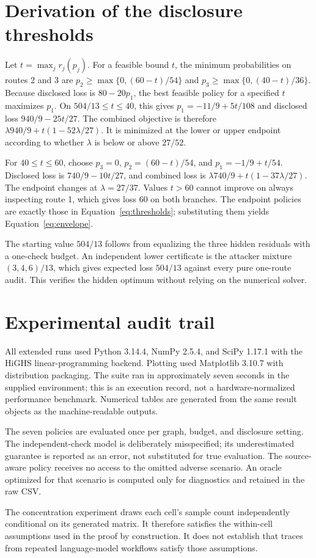 \documentclass[11pt,letterpaper]{article}
\begin{document}
\appendix
\section{Derivation of the disclosure thresholds}
\label{app:thresholds}

Let $t=\max_jr_j(p_j)$. For a feasible bound $t$, the minimum probabilities on routes 2 and 3 are
$p_2\geq\max\{0,(60-t)/54\}$ and
$p_3\geq\max\{0,(40-t)/36\}$.
Because disclosed loss is $80-20p_1$, the best feasible policy for a specified $t$ maximizes $p_1$. On $504/13\leq t\leq40$, this gives
$p_1=-11/9+5t/108$ and disclosed loss $940/9-25t/27$.
The combined objective is therefore
$\lambda940/9+t(1-52\lambda/27)$.
It is minimized at the lower or upper endpoint according to whether $\lambda$ is below or above $27/52$.

For $40\leq t\leq60$, choose $p_3=0$,
$p_2=(60-t)/54$, and $p_1=-1/9+t/54$.
Disclosed loss is $740/9-10t/27$, and combined loss is
$\lambda740/9+t(1-37\lambda/27)$.
The endpoint changes at $\lambda=27/37$.
Values $t>60$ cannot improve on always inspecting route 1, which gives loss 60 on both branches. The endpoint policies are exactly those in Equation~\ref{eq:thresholds}; substituting them yields Equation~\ref{eq:envelope}.

The starting value $504/13$ follows from equalizing the three hidden residuals with a one-check budget. An independent lower certificate is the attacker mixture $(3,4,6)/13$, which gives expected loss $504/13$ against every pure one-route audit. This verifies the hidden optimum without relying on the numerical solver.

\section{Experimental audit trail}
\label{app:trail}

All extended runs used Python 3.14.4, NumPy 2.5.4, and SciPy 1.17.1 with the HiGHS linear-programming backend. Plotting used Matplotlib 3.10.7 with distribution packaging. The suite ran in approximately seven seconds in the supplied environment; this is an execution record, not a hardware-normalized performance benchmark. Numerical tables are generated from the same result objects as the machine-readable outputs.

The seven policies are evaluated once per graph, budget, and disclosure setting. The independent-check model is deliberately misspecified; its underestimated guarantee is reported as an error, not substituted for true evaluation. The source-aware policy receives no access to the omitted adverse scenario. An oracle optimized for that scenario is computed only for diagnostics and retained in the raw CSV.

The concentration experiment draws each cell's sample count independently conditional on its generated matrix. It therefore satisfies the within-cell assumptions used in the proof by construction. It does not establish that traces from repeated language-model workflows satisfy those assumptions.
\end{document}
